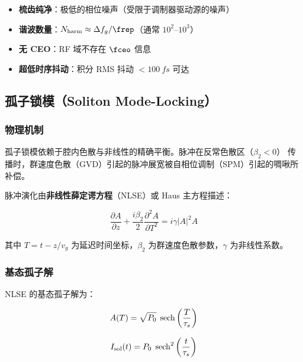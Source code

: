 \documentclass[11pt,a4paper]{article}
\newcommand{\gvd}{\beta_2}
\newcommand{\spm}{\gamma}
\begin{document}
\begin{tcolorbox}[width=0.95\textwidth, colback=green!5, colframe=green!50, title=主动锁模 RF 特征总结]
\begin{itemize}
    \item \textbf{梳齿纯净}：极低的相位噪声（受限于调制器驱动源的噪声）
    \item \textbf{谐波数量}：$N_{\text{harm}} \approx \Delta f_g / \frep$（通常 $10^2$--$10^3$）
    \item \textbf{无 CEO}：RF 域不存在 $\fceo$ 信息
    \item \textbf{超低时序抖动}：积分 RMS 抖动 $< \SI{100}{fs}$ 可达
\end{itemize}
\end{tcolorbox}

\subsection{孤子锁模（Soliton Mode-Locking）}

\subsubsection{物理机制}

孤子锁模依赖于腔内色散与非线性的精确平衡。脉冲在反常色散区（$\gvd < 0$）
传播时，群速度色散（GVD）引起的脉冲展宽被自相位调制（SPM）引起的啁啾所补偿。

脉冲演化由\textbf{非线性薛定谔方程}（NLSE）或 Haus 主方程描述\cite{Haus2000}：

\begin{equation}\label{eq:nlse}
\frac{\partial A}{\partial z} + \frac{i\gvd}{2} \frac{\partial^2 A}{\partial T^2} = i\spm |A|^2 A
\end{equation}

其中 $T = t - z/v_g$ 为延迟时间坐标，$\gvd$ 为群速度色散参数，$\spm$ 为非线性系数。

\subsubsection{基态孤子解}

NLSE 的基态孤子解为：

\begin{equation}\label{eq:soliton_shape}
A(T) = \sqrt{P_0} \; \sech\left(\frac{T}{\tau_s}\right)
\end{equation}

\begin{equation}\label{eq:soliton_intensity}
I_{\text{sol}}(t) = P_0 \; \sech^2\left(\frac{t}{\tau_s}\right)
\end{equation}
\end{document}
